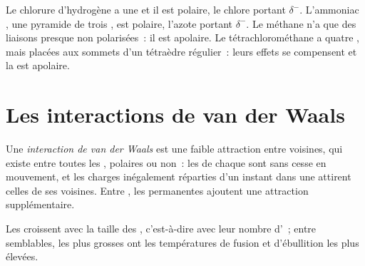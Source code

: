 \begin{example}\label{ex:g11:polarity-and-cohesion:four}
Le chlorure d'hydrogène  a une  et il est
polaire, le chlore portant $\delta^-$. L'ammoniac , une pyramide
de trois  , est polaire, l'azote portant
$\delta^-$. Le méthane  n'a que des liaisons  presque
non polarisées~: il est apolaire. Le tétrachlorométhane  a
quatre  , mais placées aux sommets d'un
tétraèdre régulier~: leurs effets se compensent et la  est
apolaire.
\end{example}

\section{Les interactions de van der Waals}

\begin{definition}\label{def:g11:polarity-and-cohesion:van-der-waals}
Une \emph{interaction de van der Waals}
est une faible attraction entre  voisines, qui existe entre
toutes les , polaires ou non~: les  de chaque 
sont sans cesse en mouvement, et les charges inégalement réparties d'un
instant dans une  attirent celles de ses voisines. Entre
, les  permanentes ajoutent une
attraction supplémentaire.
\end{definition}


\begin{proposition}\label{prop:g11:polarity-and-cohesion:size}
Les  croissent avec la taille des
, c'est-à-dire avec leur nombre d'~; entre 
semblables, les plus grosses ont les températures de fusion et
d'ébullition les plus élevées.
\end{proposition}

